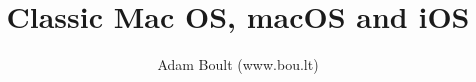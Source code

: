 \documentclass[oneside]{book}
\begin{document}
\author{Adam Boult (www.bou.lt)}
\title{Classic Mac OS, macOS and iOS}
\maketitle

\setcounter{tocdepth}{0}
\tableofcontents


\end{document}
